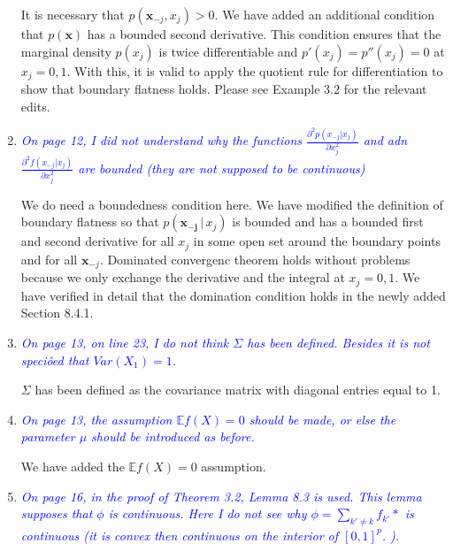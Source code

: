 \documentclass[pdftex,12pt]{article}
\def\E{{\mathbb E}}
\def\rc#1{{\it\textcolor{blue}{#1}}\smallskip}
\begin{document}
\begin{enumerate}
It is necessary that $p(\mathbf{x}_{-j}, x_j) > 0$. We have added an additional condition that $p(\mathbf{x})$ has a bounded second derivative. This condition ensures that the marginal density $p(x_j)$ is twice differentiable and $p'(x_j) = p''(x_j) = 0$ at $x_j = 0,1$. With this, it is valid to apply the quotient rule for differentiation to show that boundary flatness holds. Please see Example 3.2 for the relevant edits.


\item \rc{On page 12, I did not understand why the functions 
$\frac{\partial^2 p(x_{-j} |  x_j)}{\partial x_j^2}$
and adn 
$\frac{\partial^2 f(x_{-j} |  x_j)}{\partial x_j^2}$
are bounded (they are not supposed to be continuous)}


We do need a boundedness condition here. We have modified the definition of boundary flatness so that $p(\mathbf{x_{-j}} \,|\, x_j)$ is bounded and has a bounded first and second derivative for all $x_j$ in some open set around the boundary points and for all $\mathbf{x}_{-j}$. Dominated convergenc theorem holds without problems because we only exchange the derivative and the integral at $x_j = 0,1$. We have verified in detail that the domination condition holds in the newly added Section 8.4.1.


\item \rc{On page 13, on line 23, I do not think $\Sigma$ has been defined. Besides it
is not speciôed that $Var(X_1) = 1$.}

$\Sigma$ has been defined as the covariance matrix with diagonal entries equal to 1.


\item \rc{On page 13, the assumption $\E f(X) = 0$ should be made, or else the
parameter $\mu$ should be introduced as before.}

We have added the $\E f(X) = 0$ assumption.


\item \rc{On page 16, in the proof of Theorem 3.2, Lemma 8.3 is used. This
lemma supposes that $\phi$ is continuous. Here I do not see why $\phi =
\sum_{k'\neq k} f_{k'}*$ is continuous (it is convex then continuous on the interior of
$[0,1]^p$. ).}


\end{enumerate}
\end{document}
